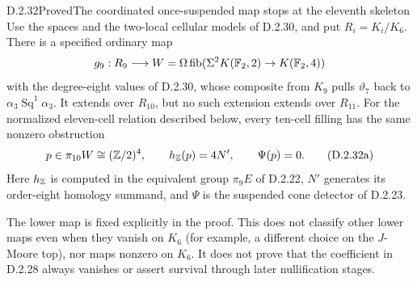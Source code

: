 \begin{claim}{D.2.32}{Proved}{The coordinated once-suspended map stops at the eleventh skeleton}
Use the spaces and the two-local cellular models of D.2.30, and put
$R_i=K_i/K_6$. There is a specified ordinary map
\[
 g_9:R_9\longrightarrow W=\Omega\operatorname{fib}(\Sigma^2K(\mathbb F_2,2)
                         \to K(\mathbb F_2,4))
\]
with the degree-eight values of D.2.30, whose composite from $K_9$
pulls $\vartheta_7$ back to $\alpha_3\operatorname{Sq}^1\alpha_3$.
It extends over $R_{10}$, but no such extension extends over $R_{11}$.
For the normalized eleven-cell relation described below, every
ten-cell filling has the same nonzero obstruction
\[
 p\in\pi_{10}W\cong(\mathbb Z/2)^4,
 \qquad h_{\mathbb Z}(p)=4N',\qquad \Psi(p)=0.
 \tag{D.2.32a}
\]
Here $h_{\mathbb Z}$ is computed in the equivalent group $\pi_9E$ of
D.2.22, $N'$ generates its order-eight homology summand, and
$\Psi$ is the suspended cone detector of D.2.23.

The lower map is fixed explicitly in the proof. This does not
classify other lower maps even when they vanish on $K_6$
(for example, a different choice on the $J$-Moore top), nor
maps nonzero on $K_6$. It does not prove that the coefficient
in D.2.28 always vanishes or assert survival through later
nullification stages.
\end{claim}
